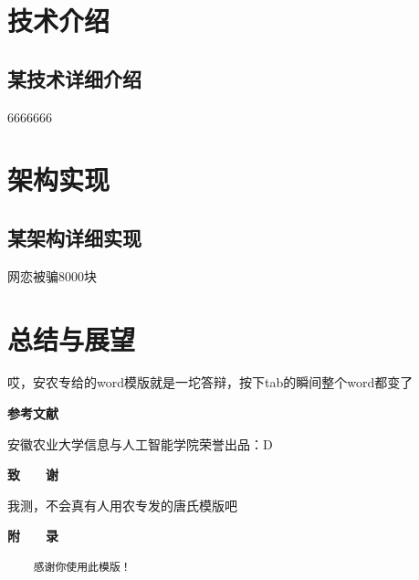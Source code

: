 \documentclass[UTF8,a4paper,12pt]{ctexart}
\begin{document}
	\section{\fontsize{16pt}{\baselineskip}\heiti 技术介绍}
	\subsection{\fontsize{14pt}{\baselineskip}\heiti 某技术详细介绍}
	6666666
	
	\section{\fontsize{16pt}{\baselineskip}\heiti 架构实现}
	\subsection{\fontsize{14pt}{\baselineskip}\heiti 某架构详细实现}
	网恋被骗8000块

	\section{\fontsize{16pt}{\baselineskip}\heiti 总结与展望}
	哎，安农专给的word模版就是一坨答辩，按下tab的瞬间整个word都变了
	
	
	
	\newpage
	 
	\centerline{\textbf{\fontsize{16pt}{\baselineskip}\heiti 参考文献}}
	\vspace{-0.5cm} 
	\renewcommand{\refname}{\leftline{Reference}}
	\begin{thebibliography}{}
		\vspace{-1cm} 
		安徽农业大学信息与人工智能学院荣誉出品：D
		
	\end{thebibliography}
	
	\newpage
	 
	\centerline{\textbf{\fontsize{16pt}{\baselineskip}\heiti 致　　谢}}
	\vspace{0.4cm}
	我测，不会真有人用农专发的唐氏模版吧
	\newpage
	\pagestyle{empty}
	 
	\centerline{\textbf{\fontsize{16pt}{\baselineskip}\heiti 附　　录}}
	\begin{spacing}{1.1}
	\begin{verbatim}
	感谢你使用此模版！
		
	\end{verbatim}
	\end{spacing}
	
	
\end{document}
